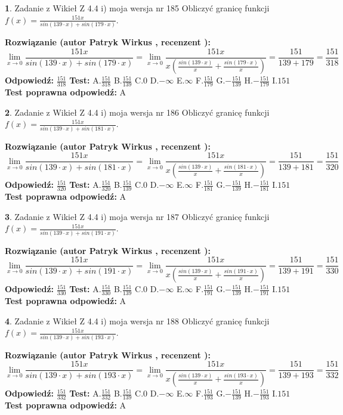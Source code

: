 \documentclass[12pt, a4paper]{article}
\theoremstyle{definition} %
\newtheorem{zad}{}
\newcommand{\zadStart}[1]{\begin{zad}#1\newline}
\newcommand{\zadStop}{\end{zad}}
\newcommand{\rozwStart}[2]{\noindent \textbf{Rozwiązanie (autor #1 , recenzent #2): }\newline}
\newcommand{\rozwStop}{\newline}
\newcommand{\odpStart}{\noindent \textbf{Odpowiedź:}\newline}
\newcommand{\odpStop}{\newline}
\newcommand{\testStart}{\noindent \textbf{Test:}\newline}
\newcommand{\testStop}{\newline}
\newcommand{\kluczStart}{\noindent \textbf{Test poprawna odpowiedź:}\newline}
\newcommand{\kluczStop}{\newline}
\begin{document}
\zadStart{Zadanie z Wikieł Z 4.4 i) moja wersja nr 185}
Obliczyć granicę funkcji $f(x)=\frac{151x}{sin(139\cdot x) +sin(179\cdot x)}$.
\zadStop
\rozwStart{Patryk Wirkus}{}
$$\lim\limits_{x\to 0}\frac{151x}{sin(139\cdot x) +sin(179\cdot x)}=\lim\limits_{x\to 0}\frac{151x}{x(\frac{sin(139\cdot x)}{x}+\frac{sin(179\cdot x)}{x})}=\frac{151}{139+179} = \frac{151}{318}$$
\rozwStop
\odpStart
$\frac{151}{318}$
\odpStop
\testStart
A.$\frac{151}{318}$
B.$\frac{151}{139}$
C.$0$
D.$-\infty$
E.$\infty$
F.$\frac{151}{179}$
G.$-\frac{151}{139}$
H.$-\frac{151}{179}$
I.$151$
\testStop
\kluczStart
A
\kluczStop



\zadStart{Zadanie z Wikieł Z 4.4 i) moja wersja nr 186}
Obliczyć granicę funkcji $f(x)=\frac{151x}{sin(139\cdot x) +sin(181\cdot x)}$.
\zadStop
\rozwStart{Patryk Wirkus}{}
$$\lim\limits_{x\to 0}\frac{151x}{sin(139\cdot x) +sin(181\cdot x)}=\lim\limits_{x\to 0}\frac{151x}{x(\frac{sin(139\cdot x)}{x}+\frac{sin(181\cdot x)}{x})}=\frac{151}{139+181} = \frac{151}{320}$$
\rozwStop
\odpStart
$\frac{151}{320}$
\odpStop
\testStart
A.$\frac{151}{320}$
B.$\frac{151}{139}$
C.$0$
D.$-\infty$
E.$\infty$
F.$\frac{151}{181}$
G.$-\frac{151}{139}$
H.$-\frac{151}{181}$
I.$151$
\testStop
\kluczStart
A
\kluczStop



\zadStart{Zadanie z Wikieł Z 4.4 i) moja wersja nr 187}
Obliczyć granicę funkcji $f(x)=\frac{151x}{sin(139\cdot x) +sin(191\cdot x)}$.
\zadStop
\rozwStart{Patryk Wirkus}{}
$$\lim\limits_{x\to 0}\frac{151x}{sin(139\cdot x) +sin(191\cdot x)}=\lim\limits_{x\to 0}\frac{151x}{x(\frac{sin(139\cdot x)}{x}+\frac{sin(191\cdot x)}{x})}=\frac{151}{139+191} = \frac{151}{330}$$
\rozwStop
\odpStart
$\frac{151}{330}$
\odpStop
\testStart
A.$\frac{151}{330}$
B.$\frac{151}{139}$
C.$0$
D.$-\infty$
E.$\infty$
F.$\frac{151}{191}$
G.$-\frac{151}{139}$
H.$-\frac{151}{191}$
I.$151$
\testStop
\kluczStart
A
\kluczStop



\zadStart{Zadanie z Wikieł Z 4.4 i) moja wersja nr 188}
Obliczyć granicę funkcji $f(x)=\frac{151x}{sin(139\cdot x) +sin(193\cdot x)}$.
\zadStop
\rozwStart{Patryk Wirkus}{}
$$\lim\limits_{x\to 0}\frac{151x}{sin(139\cdot x) +sin(193\cdot x)}=\lim\limits_{x\to 0}\frac{151x}{x(\frac{sin(139\cdot x)}{x}+\frac{sin(193\cdot x)}{x})}=\frac{151}{139+193} = \frac{151}{332}$$
\rozwStop
\odpStart
$\frac{151}{332}$
\odpStop
\testStart
A.$\frac{151}{332}$
B.$\frac{151}{139}$
C.$0$
D.$-\infty$
E.$\infty$
F.$\frac{151}{193}$
G.$-\frac{151}{139}$
H.$-\frac{151}{193}$
I.$151$
\testStop
\kluczStart
A
\kluczStop
\end{document}
